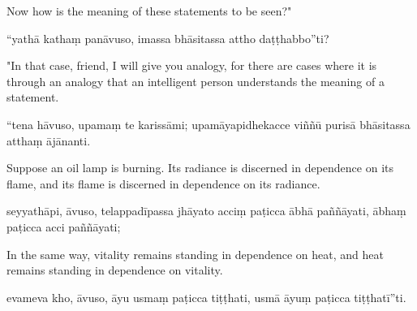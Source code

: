 \begin{samepage}
\begin{leftcolumn*}
Now how is the meaning of these statements to be seen?"
\end{leftcolumn*}

\begin{rightcolumn}
“yathā kathaṃ panāvuso, imassa bhāsitassa attho daṭṭhabbo”ti?
\end{rightcolumn}
\end{samepage}

\begin{samepage}
\begin{leftcolumn*}
"In that case, friend, I will give you analogy, for there are cases where it is through an analogy that an intelligent person understands the meaning of a statement.
\end{leftcolumn*}

\begin{rightcolumn}
“tena hāvuso, upamaṃ te karissāmi; upamāyapidhekacce viññū purisā bhāsitassa atthaṃ ājānanti.
\end{rightcolumn}
\end{samepage}

\begin{samepage}
\begin{leftcolumn*}
Suppose an oil lamp is burning. Its radiance is discerned in dependence on its flame, and its flame is discerned in dependence on its radiance.
\end{leftcolumn*}

\begin{rightcolumn}
seyyathāpi, āvuso, telappadīpassa jhāyato acciṃ paṭicca ābhā paññāyati, ābhaṃ paṭicca acci paññāyati;
\end{rightcolumn}
\end{samepage}

\begin{samepage}
\begin{leftcolumn*}
In the same way, vitality remains standing in dependence on heat, and heat remains standing in dependence on vitality.
\end{leftcolumn*}

\begin{rightcolumn}
evameva kho, āvuso, āyu usmaṃ paṭicca tiṭṭhati, usmā āyuṃ paṭicca tiṭṭhatī”ti.
\end{rightcolumn}
\end{samepage}

